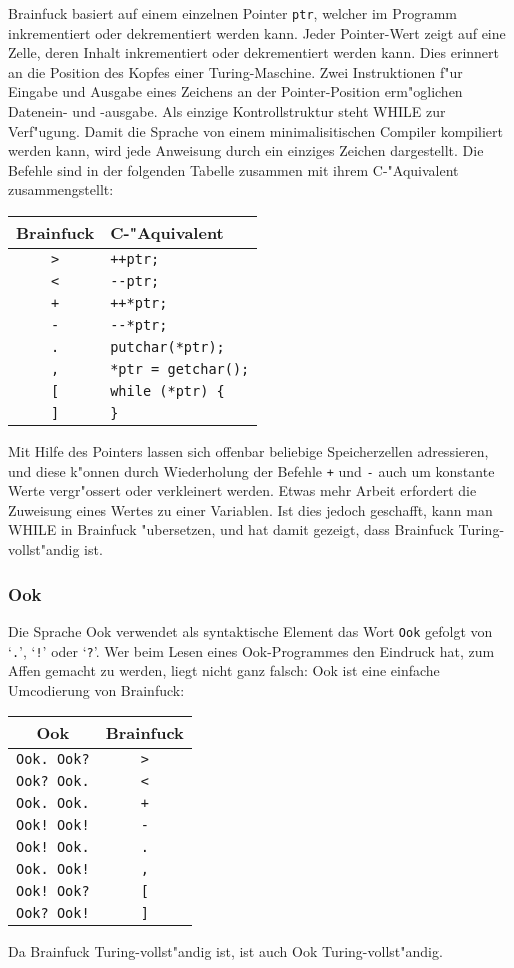 Brainfuck basiert auf einem einzelnen Pointer {\tt ptr}, welcher
im Programm inkrementiert oder dekrementiert werden kann.
Jeder Pointer-Wert zeigt auf eine Zelle, deren Inhalt inkrementiert
oder dekrementiert werden kann.
Dies erinnert an die Position des Kopfes einer Turing-Maschine.
Zwei Instruktionen f"ur Eingabe und Ausgabe eines Zeichens
an der Pointer-Position erm"oglichen Datenein- und -ausgabe.
Als einzige Kontrollstruktur steht WHILE zur Verf"ugung. Damit
die Sprache von einem minimalisitischen Compiler kompiliert
werden kann, wird jede Anweisung durch ein einziges Zeichen
dargestellt. Die Befehle sind in der folgenden Tabelle
zusammen mit ihrem C-"Aquivalent zusammengstellt:
\begin{center}
\begin{tabular}{|c|l|}
\hline
Brainfuck&C-"Aquivalent\\
\hline
{\tt >}&\verb/++ptr;/\\
{\tt <}&\verb/--ptr;/\\
{\tt +}&\verb/++*ptr;/\\
{\tt -}&\verb/--*ptr;/\\
{\tt .}&\verb/putchar(*ptr);/\\
{\tt ,}&\verb/*ptr = getchar();/\\
{\tt [}&\verb/while (*ptr) {/\\
{\tt ]}&\verb/}/\\
\hline
\end{tabular}
\end{center}
Mit Hilfe des Pointers lassen sich offenbar beliebige Speicherzellen
adressieren, und diese k"onnen durch Wiederholung der Befehle {\tt +}
und {\tt -} auch um konstante Werte vergr"ossert
oder verkleinert werden. Etwas mehr Arbeit erfordert die Zuweisung
eines Wertes zu einer Variablen. Ist dies jedoch geschafft, kann
man WHILE in Brainfuck "ubersetzen, und hat damit gezeigt, dass
Brainfuck Turing-vollst"andig ist.

\subsubsection{Ook}
Die Sprache Ook verwendet als syntaktische Element das Wort {\tt Ook} gefolgt
von `{\tt .}', `{\tt !}' oder `{\tt ?}'. Wer beim Lesen eines Ook-Programmes
den Eindruck hat, zum Affen gemacht zu werden, liegt nicht ganz falsch:
Ook ist eine einfache Umcodierung von Brainfuck:
\begin{center}
\begin{tabular}{|c|c|}
\hline
Ook&Brainfuck\\
\hline
{\tt Ook. Ook?}&{\tt >}\\
{\tt Ook? Ook.}&{\tt <}\\
{\tt Ook. Ook.}&{\tt +}\\
{\tt Ook! Ook!}&{\tt -}\\
{\tt Ook! Ook.}&{\tt .}\\
{\tt Ook. Ook!}&{\tt ,}\\
{\tt Ook! Ook?}&{\tt [}\\
{\tt Ook? Ook!}&{\tt ]}\\
\hline
\end{tabular}
\end{center}
Da Brainfuck Turing-vollst"andig ist, ist auch Ook Turing-vollst"andig.
